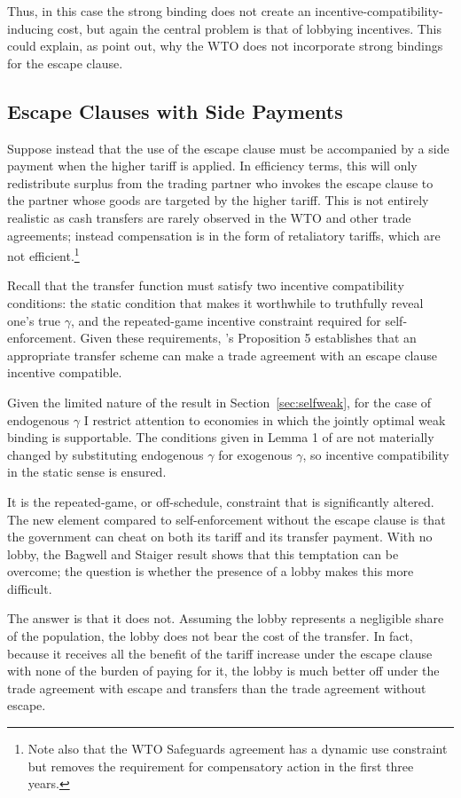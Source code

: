 \documentclass[12pt,titlepage]{article}
\newcommand{\ga}{\gamma}
\begin{document}
Thus, in this case the strong binding does not create an incentive-compatibility-inducing cost, but again the central problem is that of lobbying incentives. This could explain, as \Textcite{bs2005} point out, why the WTO does not incorporate strong bindings for the escape clause.

\subsection{Escape Clauses with Side Payments}
Suppose instead that the use of the escape clause must be accompanied by a side payment when the higher tariff is applied. In efficiency terms, this will only redistribute surplus from the trading partner who invokes the escape clause to the partner whose goods are targeted by the higher tariff. This is not entirely realistic as cash transfers are rarely observed in the WTO and other trade agreements; instead compensation is in the form of retaliatory tariffs, which are not efficient.\footnote{Note also that the WTO Safeguards agreement has a dynamic use constraint but removes the requirement for compensatory action in the first three years.}

Recall that the transfer function must satisfy two incentive compatibility conditions: the static condition that makes it worthwhile to truthfully reveal one's true $\ga$, and the repeated-game incentive constraint required for self-enforcement. Given these requirements, \Textcite{bs2005}'s Proposition 5 establishes that an appropriate transfer scheme can make a trade agreement with an escape clause incentive compatible.

Given the limited nature of the result in Section~\ref{sec:selfweak}, for the case of endogenous $\ga$ I restrict attention to economies in which the jointly optimal weak binding is supportable. The conditions given in Lemma 1 of \Textcite{bs2005} are not materially changed by substituting endogenous $\ga$ for exogenous $\ga$, so incentive compatibility in the static sense is ensured.

It is the repeated-game, or off-schedule, constraint that is significantly altered. The new element compared to self-enforcement without the escape clause is that the government can cheat on both its tariff and its transfer payment. With no lobby, the Bagwell and Staiger result shows that this temptation can be overcome; the question is whether the presence of a lobby makes this more difficult.

The answer is that it does not. Assuming the lobby represents a negligible share of the population, the lobby does not bear the cost of the transfer. In fact, because it receives all the benefit of the tariff increase under the escape clause with none of the burden of paying for it, the lobby is much better off under the trade agreement with escape and transfers than the trade agreement without escape.
\end{document}
